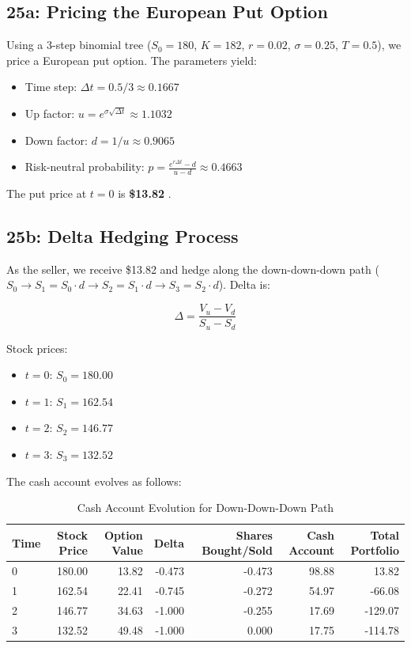 \documentclass{article}
\begin{document}
\subsection*{25a: Pricing the European Put Option}

Using a 3-step binomial tree ($S_0 = 180$, $K = 182$, $r = 0.02$, $\sigma = 0.25$, $T = 0.5$), we price a European put option. The parameters yield:

\begin{itemize}
    \item Time step: $\Delta t = 0.5 / 3 \approx 0.1667$
    \item Up factor: $u = e^{\sigma \sqrt{\Delta t}} \approx 1.1032$
    \item Down factor: $d = 1/u \approx 0.9065$
    \item Risk-neutral probability: $p = \frac{e^{r \Delta t} - d}{u - d} \approx 0.4663$
\end{itemize}

The put price at $t=0$ is \textbf{\$13.82} \citep{hull2018options}.

\subsection*{25b: Delta Hedging Process}

As the seller, we receive \$13.82 and hedge along the down-down-down path ($S_0 \to S_1 = S_0 \cdot d \to S_2 = S_1 \cdot d \to S_3 = S_2 \cdot d$). Delta is:

\begin{equation}
\Delta = \frac{V_u - V_d}{S_u - S_d}
\end{equation}

Stock prices:

\begin{itemize}
    \item $t=0$: $S_0 = 180.00$
    \item $t=1$: $S_1 = 162.54$
    \item $t=2$: $S_2 = 146.77$
    \item $t=3$: $S_3 = 132.52$
\end{itemize}

The cash account evolves as follows:

\begin{table}[h]
\centering
\caption{Cash Account Evolution for Down-Down-Down Path}
\begin{tabular}{lrrrrrr}
\toprule
Time & Stock Price & Option Value & Delta & Shares Bought/Sold & Cash Account & Total Portfolio \\
\midrule
0 & 180.00 & 13.82 & -0.473 & -0.473 & 98.88 & 13.82 \\
1 & 162.54 & 22.41 & -0.745 & -0.272 & 54.97 & -66.08 \\
2 & 146.77 & 34.63 & -1.000 & -0.255 & 17.69 & -129.07 \\
3 & 132.52 & 49.48 & -1.000 & 0.000 & 17.75 & -114.78 \\
\bottomrule
\end{tabular}
\end{table}
\end{document}
